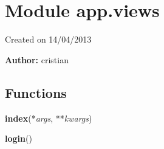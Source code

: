 %
%
%


\section{Module app.views}

    \label{app:views}
Created on 14/04/2013

\textbf{Author:} cristian





  \subsection{Functions}

    \label{app:views:index}

    \vspace{0.5ex}

\hspace{.8\funcindent}\begin{boxedminipage}{\funcwidth}

    \raggedright \textbf{index}(*\textit{args}, **\textit{kwargs})

\setlength{\parskip}{2ex}
\setlength{\parskip}{1ex}
    \end{boxedminipage}

    \label{app:views:login}

    \vspace{0.5ex}

\hspace{.8\funcindent}\begin{boxedminipage}{\funcwidth}

    \raggedright \textbf{login}()

\setlength{\parskip}{2ex}
\setlength{\parskip}{1ex}
    \end{boxedminipage}

